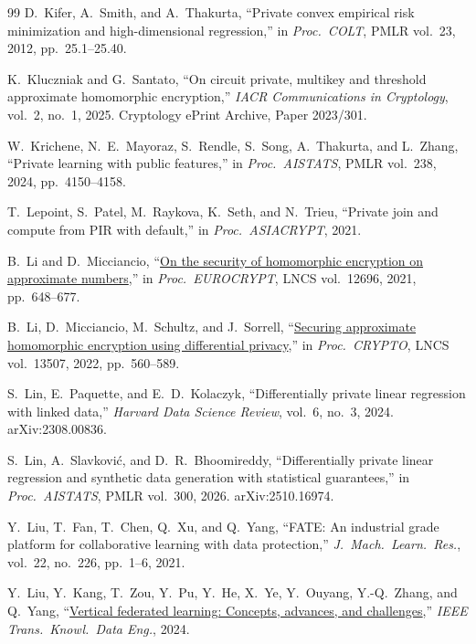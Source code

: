 \documentclass[11pt]{article}
\theoremstyle{definition}
\theoremstyle{plain}
\begin{document}
\begin{thebibliography}{99}
D.~Kifer, A.~Smith, and A.~Thakurta,
``Private convex empirical risk minimization and high-dimensional regression,''
in \textit{Proc.\ COLT}, PMLR vol.~23, 2012, pp.\ 25.1--25.40.

K.~Kluczniak and G.~Santato,
``On circuit private, multikey and threshold approximate homomorphic encryption,''
\textit{IACR Communications in Cryptology}, vol.~2, no.~1, 2025. Cryptology ePrint Archive, Paper 2023/301.

W.~Krichene, N.~E.~Mayoraz, S.~Rendle, S.~Song, A.~Thakurta, and L.~Zhang,
``Private learning with public features,''
in \textit{Proc.\ AISTATS}, PMLR vol.~238, 2024, pp.\ 4150--4158.

T.~Lepoint, S.~Patel, M.~Raykova, K.~Seth, and N.~Trieu,
``Private join and compute from PIR with default,''
in \textit{Proc.\ ASIACRYPT}, 2021.

B.~Li and D.~Micciancio,
``\href{https://doi.org/10.1007/978-3-030-77870-5_23}{On the security of homomorphic encryption on approximate numbers},''
in \textit{Proc.\ EUROCRYPT}, LNCS vol.~12696, 2021, pp.\ 648--677.

B.~Li, D.~Micciancio, M.~Schultz, and J.~Sorrell,
``\href{https://doi.org/10.1007/978-3-031-15802-5_20}{Securing approximate homomorphic encryption using differential privacy},''
in \textit{Proc.\ CRYPTO}, LNCS vol.~13507, 2022, pp.\ 560--589.

S.~Lin, E.~Paquette, and E.~D.~Kolaczyk,
``Differentially private linear regression with linked data,''
\textit{Harvard Data Science Review}, vol.~6, no.~3, 2024. arXiv:2308.00836.

S.~Lin, A.~Slavkovi\'c, and D.~R.~Bhoomireddy,
``Differentially private linear regression and synthetic data generation with statistical guarantees,''
in \textit{Proc.\ AISTATS}, PMLR vol.~300, 2026. arXiv:2510.16974.

Y.~Liu, T.~Fan, T.~Chen, Q.~Xu, and Q.~Yang,
``FATE: An industrial grade platform for collaborative learning with data protection,''
\textit{J.\ Mach.\ Learn.\ Res.}, vol.~22, no.~226, pp.\ 1--6, 2021.

Y.~Liu, Y.~Kang, T.~Zou, Y.~Pu, Y.~He, X.~Ye, Y.~Ouyang, Y.-Q.~Zhang, and Q.~Yang,
``\href{https://doi.org/10.1109/TKDE.2024.3352628}{Vertical federated learning: Concepts, advances, and challenges},''
\textit{IEEE Trans.\ Knowl.\ Data Eng.}, 2024.


\end{thebibliography}
\end{document}

